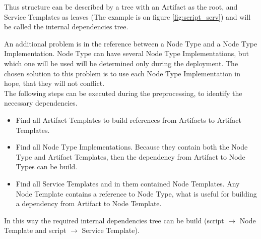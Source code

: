 Thus structure can be described by a tree with an Artifact as the root, and Service Templates as leaves (The example is on figure \ref{fig:script_serv}) and will be called the internal dependencies tree.

An additional problem is in the reference between a Node Type and a Node Type Implementation.
Node Type can have several Node Type Implementations, but which one will be used will be determined only during the deployment. 
The chosen solution to this problem is to use each Node Type Implementation in hope, that they will not conflict.\\
The following steps can be executed during the preprocessing, to identify the necessary dependencies.
\begin{itemize}
	\item Find all Artifact Templates to build references from Artifacts to Artifact Templates.
	\item Find all Node Type Implementations. Because they contain both the Node Type and Artifact Templates, then the dependency from Artifact to Node Types can be build.
	\item Find all Service Templates and in them contained Node Templates. Any Node Template contains a reference to Node Type, what is useful for building a dependency from Artifact to Node Template.
\end{itemize} 
In this way the required internal dependencies tree can be build (script $\rightarrow$ Node Template and script $\rightarrow$ Service Template).
